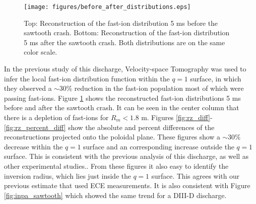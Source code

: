 \begin{figure}[h!]
    \centering
    \texttt{[image: figures/before\_after\_distributions.eps]}
    \caption{Top: Reconstruction of the fast-ion distribution 5 ms before the sawtooth crash. Bottom: Reconstruction of the fast-ion distribution 5 ms after the sawtooth crash. Both distributions are on the same color scale.}
    \label{fig:before_after}
\end{figure}
In the previous study of this discharge\cite{salewski2016high}, Velocity-space Tomography was used to infer the local fast-ion distribution function within the $q=1$ surface, in which they observed a $\sim$30\% reduction in the fast-ion population most of which were passing fast-ions. Figure \ref{fig:before_after} shows the reconstructed fast-ion distributions 5 ms before and after the sawtooth crash. It can be seen in the center column that there is a depletion of fast-ions for $R_m < 1.8$ m. Figures \ref{fig:rz_diff}-\ref{fig:rz_percent_diff} show the absolute and percent differences of the reconstructions projected onto the poloidal plane. These figures show a $\sim30$\% decrease within the $q=1$ surface and an corresponding increase outside the $q=1$ surface. This is consistent with the previous analysis of this discharge, as well as other experimental studies.\cite{weiland2016,du2018inpa,salewski2016high}. From these figures it also easy to identify the inversion radius, which lies just inside the $q=1$ surface. This agrees with our previous estimate that used ECE measurements. It is also consistent with Figure \ref{fig:inpa_sawtooth} which showed the same trend for a DIII-D discharge.
